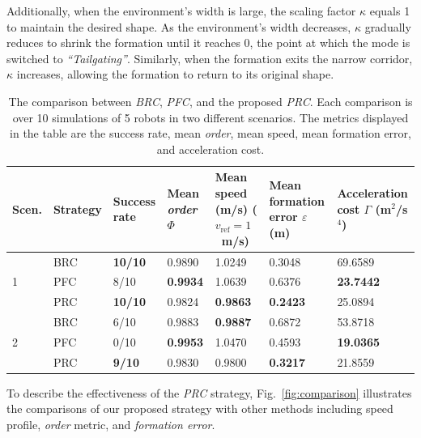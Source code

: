 Additionally, when the environment's width is large, the scaling factor $\kappa$ equals 1 to maintain the desired shape. As the environment's width decreases, $\kappa$ gradually reduces to shrink the formation until it reaches 0, the point at which the mode is switched to \textit{``Tailgating''}. Similarly, when the formation exits the narrow corridor, $\kappa$ increases, allowing the formation to return to its original shape.

\begin{table}
\centering
\caption{The comparison between \textit{BRC}, \textit{PFC}, and the proposed \textit{PRC}. Each comparison is over 10 simulations of 5 robots in two
different scenarios. The metrics displayed in the table are
the success rate, mean \textit{order}, mean speed, mean formation error, and acceleration cost.}
\label{tbl:analys}
\begin{tabular}{C{1.0cm}C{1.4cm}C{1.8cm}C{1.8cm}C{2.5cm}C{2.3cm}C{2.0cm}}
\hline \hline
Scen.             & Strategy & Success rate  & Mean \textit{order} $\Phi$ & Mean speed (m/s) ($v_\text{ref}=1$~m/s) & Mean formation error $\varepsilon$ (m) & Acceleration cost $\Gamma$ (m$^2$/s$^4$) \\ \hline
{} & BRC      & \textbf{10/10} & 0.9890     & 1.0249     & 0.3048               & 69.6589    \\
                     & PFC     & 8/10  & \textbf{0.9934}     & 1.0639     & 0.6376               & \textbf{23.7442}    \\
                     & PRC    & \textbf{10/10} & 0.9824     & \textbf{0.9863}     & \textbf{0.2423}               & 25.0894    \\ \hline
{}   & BRC      & 6/10  & 0.9883     & \textbf{0.9887}     & 0.6872               & 53.8718    \\
                     & PFC     & 0/10  & \textbf{0.9953}     & 1.0470      & 0.4593               & \textbf{19.0365}    \\
                     & PRC    & \textbf{9/10}  & 0.9830     & 0.9800       & \textbf{0.3217}               & 21.8559   \\ \hline \hline
\end{tabular}
\end{table}

To describe the effectiveness of the \textit{PRC} strategy, Fig.~\ref{fig:comparison} illustrates the comparisons of our proposed strategy with other methods including speed profile, \textit{order} metric, and \textit{formation error}. 

